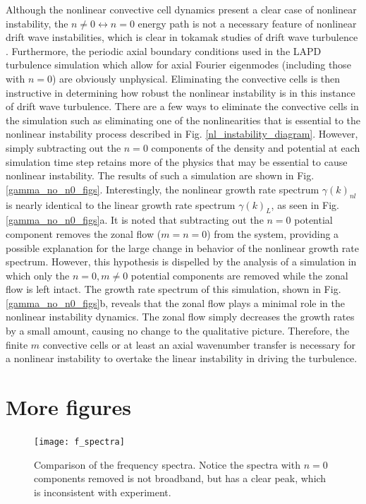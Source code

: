 \documentclass[12pt]{article}
\begin{document}
Although the nonlinear convective cell dynamics present a clear case of nonlinear instability, the $n \ne 0 \leftrightarrow n=0$ energy path is not a necessary feature of nonlinear drift wave
instabilities, which is clear in tokamak studies of drift wave turbulence \cite{zeiler1996,zeiler1997,scott2002,scott2003,scott2005}. Furthermore, the periodic axial boundary conditions
used in the LAPD turbulence simulation which allow for axial Fourier eigenmodes (including those with $n=0$) are obviously unphysical. Eliminating the convective cells is then instructive
in determining how robust the nonlinear instability is in this instance of drift wave turbulence. There are a few ways to eliminate the convective cells in the simulation such as
eliminating one of the nonlinearities that is essential to the nonlinear instability process described in Fig. \ref{nl_instability_diagram}. However, simply subtracting out the $n=0$
components of the density and potential at each simulation time step retains more of the physics that may be essential to cause nonlinear instability. The results of such a simulation
are shown in Fig. \ref{gamma_no_n0_figs}. Interestingly, the nonlinear growth rate spectrum $\gamma(k)_{nl}$ is nearly identical to the linear growth rate spectrum $\gamma(k)_L$, as seen in
Fig. \ref{gamma_no_n0_figs}a. It is noted that subtracting out the $n=0$ potential component removes the zonal flow ($m=n=0$) from the system, providing a possible explanation for the large change
in behavior of the nonlinear growth rate spectrum. However, this hypothesis is dispelled by the analysis of a simulation in which only the $n=0, m \ne 0$ potential components are removed while 
the zonal flow is left intact. The growth rate spectrum of this simulation, shown in Fig. \ref{gamma_no_n0_figs}b, reveals that the zonal flow plays a minimal role in the nonlinear instability
dynamics. The zonal flow simply decreases the growth rates by a small amount, causing no change to the qualitative picture. Therefore, the finite $m$ convective cells or at least an axial
wavenumber transfer is necessary for a nonlinear instability to overtake the linear instability in driving the turbulence.

\section{More figures}

\begin{figure}
\texttt{[image: f\_spectra]}
\hfil
\caption{Comparison of the frequency spectra. Notice the spectra with $n=0$ components removed is not broadband, but has a clear peak, which is inconsistent with experiment.}
\label{freq_spectra}
\end{figure}
\end{document}
